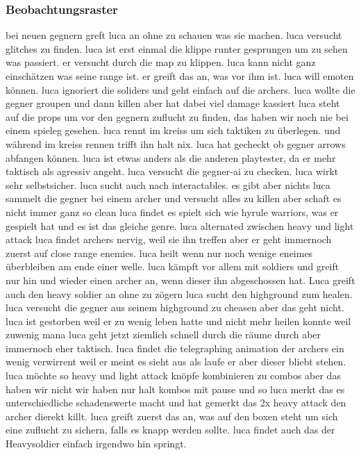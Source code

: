 \documentclass[../Main.tex]{subfiles}
\begin{document}
\subsubsection{Beobachtungsraster}
bei neuen gegnern greft luca an ohne zu schauen was sie machen.
luca versucht glitches zu finden.
luca ist erst einmal die klippe runter gesprungen um zu sehen was passiert.
er versucht durch die map zu klippen.
luca kann nicht ganz einschätzen was seine range ist.
er greift das an, was vor ihm ist.
luca will emoten können.
luca ignoriert die soliders und geht einfach auf die archers.
luca wollte die gegner groupen und dann killen aber hat dabei viel damage kassiert
luca steht auf die props um vor den gegnern zuflucht zu finden, das haben wir noch nie bei einem spieleg gesehen.
luca rennt im kreiss um sich taktiken zu überlegen. und während im kreiss rennen trifft ihn halt nix.
luca hat gecheckt ob gegner arrows abfangen können.
luca ist etwas anders als die anderen playtester, da er mehr taktisch als agressiv angeht.
luca versucht die gegner-ai zu checken.
luca wirkt sehr selbstsicher.
luca sucht auch nach interactables. es gibt aber nichts
luca sammelt die gegner bei einem archer und versucht alles zu killen aber schaft es nicht immer ganz so clean
luca findet es spielt sich wie hyrule warriors, was er gespielt hat und es ist das gleiche genre.
luca alternated zwischen heavy und light attack
luca findet archers nervig, weil sie ihn treffen aber er geht immernoch zuerst auf close range enemies.
luca heilt wenn nur noch wenige eneimes überbleiben am ende einer welle.
luca kämpft vor allem mit soldiers und greift nur hin und wieder einen archer an, wenn dieser ihn abgeschossen hat.
Luca greift auch den heavy soldier an ohne zu zögern
luca sucht den highground zum healen.
luca versucht die gegner aus seinem highground zu cheasen aber das geht nicht.
luca ist gestorben weil er zu wenig leben hatte und nicht mehr heilen konnte weil zuwenig mana
luca geht jetzt ziemlich schnell durch die räume durch aber immernoch eher taktisch.
luca findet die telegraphing animation der archers ein wenig verwirrent weil er meint es sieht aus als laufe er aber dieser bliebt stehen.
luca möchte so heavy und light attack knöpfe kombinieren zu combos aber das haben wir nicht wir haben nur halt kombos mit pause und so
luca merkt das es unterschiedliche schadenswerte macht und hat gemerkt das 2x heavy attack den archer dierekt killt.
luca greift zuerst das an, was auf den boxen steht um sich eine zuflucht zu sichern, falls es knapp werden sollte.
luca findet auch das der Heavysoldier einfach irgendwo hin springt.
\end{document}
